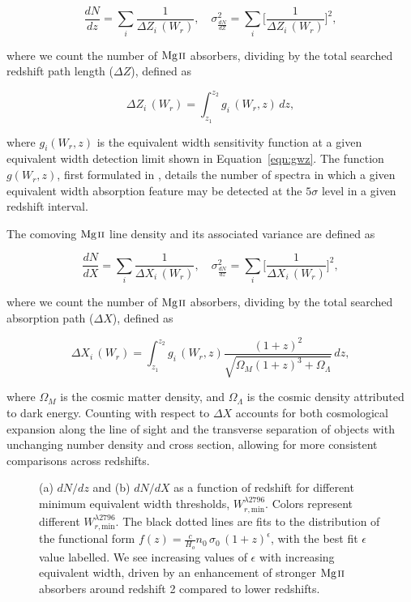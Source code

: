 \documentclass[iop,apj,numberedappendix,appendixfloats,twocolappendix]{emulateapj}
\begin{document}
\begin{equation}
\frac{d N}{d z} = \sum_{i}\frac{1}{\Delta Z_i\,(W_r)},\quad \sigma^2_{\frac{d N}{d Z}} = \sum_{i} \Big[\frac{1}{\Delta Z_i\,(W_r)}\Big]^2,
\label{eqn:dndz}
\end{equation}

\noindent
where we count the number of ${\hbox{{\rm Mg}\kern 0.1em{\sc ii}}}$ absorbers, dividing by the total searched redshift path length ($\Delta Z$), defined as

\begin{equation}
\Delta Z_i\,(W_r) = \int_{z_1}^{z_2} g_i\,(W_r, z)\,dz,
\label{eqn:deltaz}
\end{equation}

\noindent
where $g_i(W_r, z)$ is the equivalent width sensitivity function at a given equivalent width detection limit shown in Equation~\ref{eqn:gwz}. The function $g(W_r, z)$, first formulated in \cite{Lanzetta1987}, details the number of spectra in which a given equivalent width absorption feature may be detected at the $5\sigma$ level in a given redshift interval. 

The comoving ${\hbox{{\rm Mg}\kern 0.1em{\sc ii}}}$ line density and its associated variance are defined as

\begin{equation}
\frac{d N}{d X} = \sum_{i}\frac{1}{\Delta X_i\,(W_r)},\quad \sigma^2_{\frac{d N}{d z}} = \sum_{i} \Big[\frac{1}{\Delta X_i\,(W_r)}\Big]^2,
\label{eqn:dndx}
\end{equation}

\noindent
where we count the number of ${\hbox{{\rm Mg}\kern 0.1em{\sc ii}}}$ absorbers, dividing by the total searched absorption path ($\Delta X$), defined as

\begin{equation}
\Delta X_i\,(W_r) = \int_{z_1}^{z_2} g_i\,(W_r, z) \frac{(1 + z)^2}{\sqrt{\Omega_M (1 + z)^3 + \Omega_{\Lambda}}}\,dz,
\label{eqn:deltax}
\end{equation}

\noindent
where $\Omega_M$ is the cosmic matter density, and $\Omega_{\Lambda}$ is the cosmic density attributed to dark energy. Counting with respect to $\Delta X$ accounts for both cosmological expansion along the line of sight and the transverse separation of objects with unchanging number density and cross section, allowing for more consistent comparisons across redshifts. 


\begin{figure*}[bth]
\caption{(a) $dN\!/dz$ and (b) $dN\!/dX$ as a function of redshift for different minimum equivalent width thresholds, $W_{r,\mathrm{min}}^{\lambda2796}$. Colors represent different $W_{r,\mathrm{min}}^{\lambda2796}$. The black dotted lines are fits to the distribution of the functional form $f(z) = \frac{c}{H_o} n_0\,\sigma_0\,(1 + z)^{\epsilon}$, with the best fit $\epsilon$ value labelled. We see increasing values of $\epsilon$ with increasing equivalent width, driven by an enhancement of stronger ${\hbox{{\rm Mg}\kern 0.1em{\sc ii}}}$ absorbers around redshift 2 compared to lower redshifts.}
\label{fig:dndz_dndx}
\end{figure*}
\end{document}
